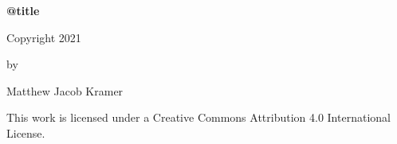 \begin{center}
  \SingleSpacing \normalsize
  \textbf{\csname @title\endcsname}

  \vspace{5\baselineskip}
  Copyright 2021
  \par\vspace{\baselineskip} by
  \par\vspace{\baselineskip} Matthew Jacob Kramer

  \vspace{5\baselineskip}%
  This work is licensed under a Creative Commons Attribution 4.0 International
  License.
\end{center}

\clearpage
